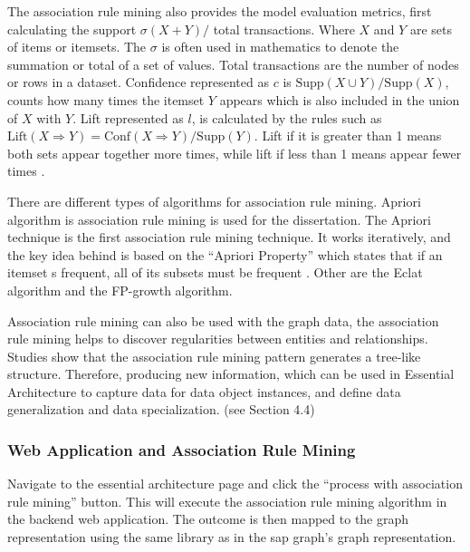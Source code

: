 \documentclass{article}
\begin{document}
The association rule mining also provides the model evaluation metrics, first calculating the support $\sigma(X + Y) /$ total transactions. Where $X$ and $Y$ are sets of items or itemsets. The $\sigma$ is often used in mathematics to denote the summation or total of a set of values. Total transactions are the number of nodes or rows in a dataset. Confidence represented as $c$ is $\text{Supp}(X \cup Y) / \text{Supp}(X)$, counts how many times the itemset $Y$ appears which is also included in the union of $X$ with $Y$. Lift represented as $l$, is calculated by the rules such as $\text{Lift}(X \Rightarrow Y) = \text{Conf}(X \Rightarrow Y) / \text{Supp}(Y)$. Lift if it is greater than 1 means both sets appear together more times, while lift if less than 1 means appear fewer times \parencite{kumbhare2014}.

There are different types of algorithms for association rule mining. Apriori algorithm is association rule mining is used for the dissertation. The Apriori technique is the first association rule mining technique. It works iteratively, and the key idea behind is based on the “Apriori Property” which states that if an itemset s frequent, all of its subsets must be frequent \parencite{yuan2017}. Other are the Eclat algorithm and the FP-growth algorithm.

Association rule mining can also be used with the graph data, the association rule mining helps to discover regularities between entities and relationships. Studies show that the association rule mining pattern generates a tree-like structure. Therefore, producing new information, which can be used in Essential Architecture to capture data for data object instances, and define data generalization and data specialization. (see Section 4.4)

\maketitle
\subsubsection{Web Application and Association Rule Mining}

Navigate to the essential architecture page and click the “process with association rule mining” button. This will execute the association rule mining algorithm in the backend web application. The outcome is then mapped to the graph representation using the same library as in the sap graph’s graph representation.
\end{document}

